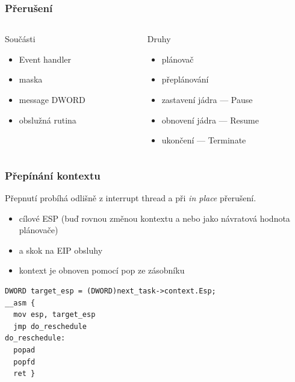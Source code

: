 \documentclass{beamer}
\begin{document}
\begin{frame}
\frametitle{Přerušení}

\begin{columns}
  \begin{column}{0.5\textwidth}
\begin{block}{Součásti}
\begin{itemize}
  \item Event handler
  \item maska
  \item message DWORD
  \item obslužná rutina
\end{itemize}
\end{block}
  \end{column}

  \begin{column}{0.5\textwidth}
\begin{block}{Druhy}
\begin{itemize}
  \item plánovač
  \item přeplánování
  \item zastavení jádra --- Pause
  \item obnovení jádra --- Resume
  \item ukončení --- Terminate
\end{itemize}
\end{block}
  \end{column}
\end{columns}

\end{frame}

\begin{frame}[fragile]
\frametitle{Přepínání kontextu}

Přepnutí probíhá odlišně z interrupt thread a při \emph{in place} přerušení.
\begin{itemize}
\item cílové ESP (buď rovnou změnou kontextu a nebo jako návratová hodnota plánovače)
\item a skok na EIP obsluhy
\item kontext je obnoven pomocí pop ze zásobníku
\end{itemize}

\begin{verbatim}
DWORD target_esp = (DWORD)next_task->context.Esp;
__asm {
  mov esp, target_esp
  jmp do_reschedule
do_reschedule:
  popad
  popfd
  ret }
\end{verbatim}
\end{frame}
\end{document}

